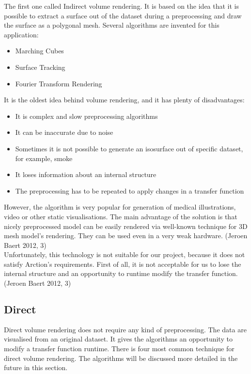 \documentclass[twoside, english, 11pt]{report}
\begin{document}
The first one called Indirect volume rendering. It is based on the idea that it is possible to extract a surface out of the dataset during a preprocessing and draw the surface as a polygonal mesh. Several algorithms are invented for this application:
\begin{itemize}
\item Marching Cubes
\item Surface Tracking
\item Fourier Transform Rendering
\end{itemize}
It is the oldest idea behind volume rendering, and it has plenty of disadvantages:
\begin{itemize}
\item It is complex and slow preprocessing algorithms
\item It can be inaccurate due to noise
\item Sometimes it is not possible to generate an isosurface out of specific dataset, for example, smoke
\item It loses information about an internal structure
\item The preprocessing has to be repeated to apply changes in a transfer function 
\end{itemize}

However, the algorithm is very popular for generation of medical illustrations, video or other static visualisations. The main advantage of the solution is that nicely preprocessed model can be easily rendered via well-known technique for 3D mesh model's rendering. They can be used even in a very weak hardware. (Jeroen Baert 2012, 3)\\

Unfortunately, this technology is not suitable for our project, because it does not satisfy Arction's requirements. First of all, it is not acceptable for us to lose the internal structure and an opportunity to runtime modify the transfer function. (Jeroen Baert 2012, 3)

\subsection{Direct}
Direct volume rendering does not require any kind of preprocessing. The data are visualised from an original dataset. It gives the algorithms an opportunity to modify a transfer function runtime. There is four most common technique for direct volume rendering. The algorithms will be discussed more detailed in the future in this section.\\
\end{document}
